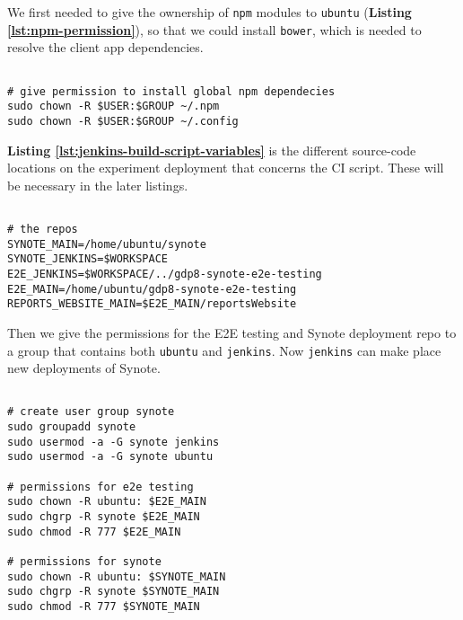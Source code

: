 We first needed to give the ownership of \texttt{npm} modules to \texttt{ubuntu} (\textbf{Listing \ref{lst:npm-permission}}), so that we could install \texttt{bower}, which is needed to resolve the client app dependencies.

\begin{listing}[H]
\begin{verbatim}

# give permission to install global npm dependecies
sudo chown -R $USER:$GROUP ~/.npm
sudo chown -R $USER:$GROUP ~/.config

\end{verbatim}
\label{lst:npm-permission}
\end{listing}

\textbf{Listing \ref{lst:jenkins-build-script-variables}} is the different source-code locations on the experiment deployment that concerns the CI script. These will be necessary in the later listings.

\begin{listing}[H]
\begin{verbatim}

# the repos
SYNOTE_MAIN=/home/ubuntu/synote
SYNOTE_JENKINS=$WORKSPACE
E2E_JENKINS=$WORKSPACE/../gdp8-synote-e2e-testing
E2E_MAIN=/home/ubuntu/gdp8-synote-e2e-testing
REPORTS_WEBSITE_MAIN=$E2E_MAIN/reportsWebsite

\end{verbatim}
\label{lst:jenkins-build-script-variables}
\end{listing}

Then we give the permissions for the E2E testing and Synote deployment repo to a group that contains both \texttt{ubuntu} and \texttt{jenkins}. Now \texttt{jenkins} can make place new deployments of Synote.

\begin{listing}[H]
\begin{verbatim}

# create user group synote
sudo groupadd synote
sudo usermod -a -G synote jenkins
sudo usermod -a -G synote ubuntu

# permissions for e2e testing
sudo chown -R ubuntu: $E2E_MAIN
sudo chgrp -R synote $E2E_MAIN
sudo chmod -R 777 $E2E_MAIN

# permissions for synote
sudo chown -R ubuntu: $SYNOTE_MAIN
sudo chgrp -R synote $SYNOTE_MAIN
sudo chmod -R 777 $SYNOTE_MAIN

\end{verbatim}
\label{lst:deployment-folder-permissions}
\end{listing}

